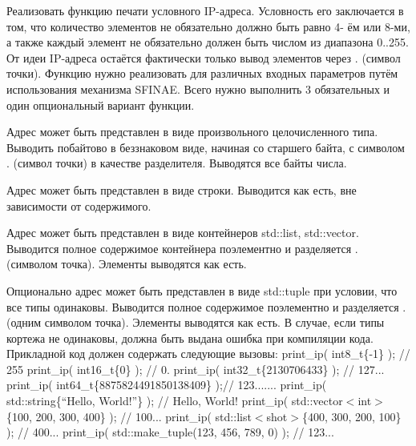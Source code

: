 Реализовать функцию печати условного IP-\/адреса. Условность его заключается в том, что количество элементов не обязательно должно быть равно 4-\/ ём или 8-\/ми, а также каждый элемент не обязательно должен быть числом из диапазона 0..255. От идеи IP-\/адреса остаётся фактически только вывод элементов через {\ttfamily .} (символ точки). Функцию нужно реализовать для различных входных параметров путём использования механизма SFINAE. Всего нужно выполнить 3 обязательных и один опциональный вариант функции.
\begin{DoxyEnumerate}
\item Адрес может быть представлен в виде произвольного целочисленного типа. Выводить побайтово в беззнаковом виде, начиная со старшего байта, с символом {\ttfamily .} (символ точки) в качестве разделителя. Выводятся все байты числа.
\item Адрес может быть представлен в виде строки. Выводится как есть, вне зависимости от содержимого.
\item Адрес может быть представлен в виде контейнеров {\ttfamily std\+::list}, {\ttfamily std\+::vector}. Выводится полное содержимое контейнера поэлементно и разделяется {\ttfamily .} (символом точка). Элементы выводятся как есть.
\item Опционально адрес может быть представлен в виде {\ttfamily std\+::tuple} при условии, что все типы одинаковы. Выводится полное содержимое поэлементно и разделяется {\ttfamily .} (одним символом точка). Элементы выводятся как есть. В случае, если типы кортежа не одинаковы, должна быть выдана ошибка при компиляции кода. Прикладной код должен содержать следующие вызовы\+: print\+\_\+ip( int8\+\_\+t\{-\/1\} ); // 255 print\+\_\+ip( int16\+\_\+t\{0\} ); // 0. print\+\_\+ip( int32\+\_\+t\{2130706433\} ); // 127... print\+\_\+ip( int64\+\_\+t\{8875824491850138409\} );// 123....... print\+\_\+ip( std\+::string\{“\+Hello, World!”\} ); // Hello, World! print\+\_\+ip( std\+::vector$<$int$>$\{100, 200, 300, 400\} ); // 100... print\+\_\+ip( std\+::list$<$shot$>$\{400, 300, 200, 100\} ); // 400... print\+\_\+ip( std\+::make\+\_\+tuple(123, 456, 789, 0) ); // 123... 
\end{DoxyEnumerate}